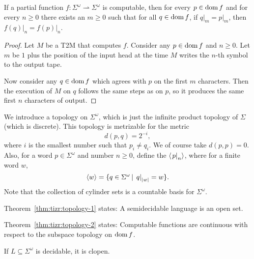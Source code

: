 
\begin{theorem}%
  \label{thm:tizr:topology-2}
  If a partial function $f: \Sigma^\omega \rightharpoonup \Sigma^\omega$ is
  computable, then for every $p \in \operatorname{dom} f$ and for every $n \ge
  0$ there exists an $m \ge 0$ such that for all $q \in \operatorname{dom} f$,
  if $\left. q \right|_m = \left. p \right|_m$, then $\left. f(q) \right|_n =
  \left. f(p) \right|_n$.
\end{theorem}

\begin{proof}
  Let $M$ be a T2M that computes $f$.
  Consider any $p \in \operatorname{dom} f$ and $n \ge 0$.
  Let $m$ be $1$ plus the position of the input head at the time $M$ writes the
  $n$-th symbol to the output tape.

  Now consider any $q \in \operatorname{dom} f$ which agrees with $p$ on the first $m$
  characters.
  Then the execution of $M$ on $q$ follows the same steps as on $p$, so it
  produces the same first $n$ characters of output.
\end{proof}


We introduce a topology on $\Sigma^\omega$, which is just the infinite product
topology of $\Sigma$ (which is discrete).
This topology is metrizable for the metric
\[
  d(p,q) = 2^{-i},
\]
where $i$ is the smallest number such that $p_i \ne q_i$.
We of course take $d(p,p) = 0$.
Also, for a word $p \in \Sigma^\omega$ and number $n \ge 0$, define the
 $\left< \left. p \right|_n \right>$, where for a finite word $w$,
\[
  \left< w \right> = \{ q \in \Sigma^\omega \,|\, \left. q \right|_{\left| w \right|} = w \}.
\]
Note that the collection of cylinder sets is a countable basis for
$\Sigma^\omega$.

\begin{remark}
  Theorem~\ref{thm:tizr:topology-1} states:
  A semidecidable language is an open set.
\end{remark}

\begin{remark}
  Theorem~\ref{thm:tizr:topology-2} states:
  Computable functions are continuous with respect to the subspace topology on
  $\operatorname{dom} f$.
\end{remark}

\begin{proposition}
  If $L \subseteq \Sigma^\omega$ is decidable, it is clopen.
\end{proposition}

